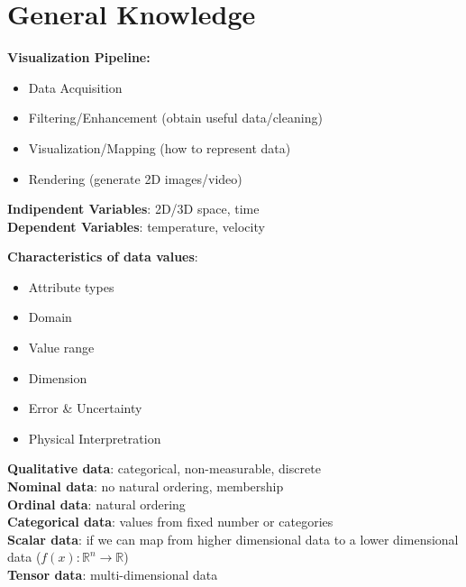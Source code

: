 \section{General Knowledge}
\textbf{Visualization Pipeline:}
\begin{itemize}
    \item Data Acquisition
    \item Filtering/Enhancement (obtain useful data/cleaning)
    \item Visualization/Mapping (how to represent data)
    \item Rendering (generate 2D images/video)
\end{itemize}

\textbf{Indipendent Variables}: 2D/3D space, time \\
\textbf{Dependent Variables}: temperature, velocity

\textbf{Characteristics of data values}:
\begin{itemize}
    \item Attribute types
    \item Domain
    \item Value range
    \item Dimension
    \item Error \& Uncertainty
    \item Physical Interpretration
\end{itemize}

\textbf{Qualitative data}: categorical, non-measurable, discrete \\
\textbf{Nominal data}: no natural ordering, membership \\
\textbf{Ordinal data}: natural ordering \\
\textbf{Categorical data}: values from fixed number or categories \\
\textbf{Scalar data}: if we can map from higher dimensional data to a lower dimensional data ($f(x): \mathbb{R}^n \rightarrow \mathbb{R}$) \\
\textbf{Tensor data}: multi-dimensional data \\
